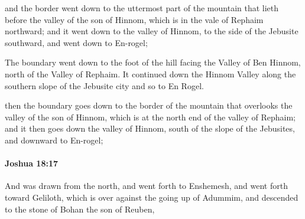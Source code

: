 			\begin{versebox}
					\item[BHS] 
					\item[ASV] and the border went down to the uttermost part of the mountain that lieth before the valley of the son of Hinnom, which is in the vale of Rephaim northward; and it went down to the valley of Hinnom, to the side of the Jebusite southward, and went down to En-rogel;
					\item[NIV] The boundary went down to the foot of the hill facing the Valley of Ben Hinnom, north of the Valley of Rephaim. It continued down the Hinnom Valley along the southern slope of the Jebusite city and so to En Rogel.
					\item[NRSV] then the boundary goes down to the border of the mountain that overlooks the valley of the son of Hinnom, which is at the north end of the valley of Rephaim; and it then goes down the valley of Hinnom, south of the slope of the Jebusites, and downward to En-rogel;
			\end{versebox}

		\paragraph{Joshua 18:17} %
			\label{JOSHUA-18-17}

			And was drawn from the north, and went forth to Enshemesh, and went forth toward Geliloth, which is over against the going up of Adummim, and descended to the stone of Bohan the son of Reuben,


